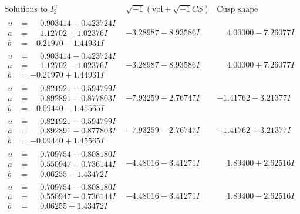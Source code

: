 \documentclass[1p]{elsarticle_modified}
\theoremstyle{definition}
\newcommand{\I}{\sqrt{-1}}
\begin{document}
$$\begin{array}{c|c|c}  
\text{Solutions to }I^u_{2}& \I (\text{vol} + \sqrt{-1}CS) & \text{Cusp shape}\\
 \hline 
\begin{aligned}
u &= \phantom{-}0.903414 + 0.423724 I \\
a &= \phantom{-}1.12702 + 1.02376 I \\
b &= -0.21970 - 1.44931 I\end{aligned}
 & -3.28987 + 8.93586 I & \phantom{-}4.00000 - 7.26077 I \\ \hline\begin{aligned}
u &= \phantom{-}0.903414 - 0.423724 I \\
a &= \phantom{-}1.12702 - 1.02376 I \\
b &= -0.21970 + 1.44931 I\end{aligned}
 & -3.28987 - 8.93586 I & \phantom{-}4.00000 + 7.26077 I \\ \hline\begin{aligned}
u &= \phantom{-}0.821921 + 0.594799 I \\
a &= \phantom{-}0.892891 + 0.877803 I \\
b &= -0.09440 - 1.45565 I\end{aligned}
 & -7.93259 + 2.76747 I & -1.41762 - 3.21377 I \\ \hline\begin{aligned}
u &= \phantom{-}0.821921 - 0.594799 I \\
a &= \phantom{-}0.892891 - 0.877803 I \\
b &= -0.09440 + 1.45565 I\end{aligned}
 & -7.93259 - 2.76747 I & -1.41762 + 3.21377 I \\ \hline\begin{aligned}
u &= \phantom{-}0.709754 + 0.808180 I \\
a &= \phantom{-}0.550947 + 0.736144 I \\
b &= \phantom{-}0.06255 - 1.43472 I\end{aligned}
 & -4.48016 - 3.41271 I & \phantom{-}1.89400 + 2.62516 I \\ \hline\begin{aligned}
u &= \phantom{-}0.709754 - 0.808180 I \\
a &= \phantom{-}0.550947 - 0.736144 I \\
b &= \phantom{-}0.06255 + 1.43472 I\end{aligned}
 & -4.48016 + 3.41271 I & \phantom{-}1.89400 - 2.62516 I \\ \hline\begin{aligned}

\end{aligned}
\end{array}$$
\end{document}

